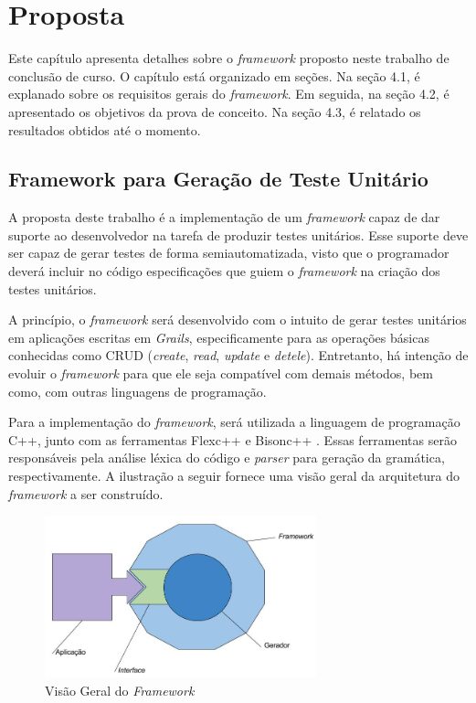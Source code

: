 \chapter[Proposta]{Proposta}
Este capítulo apresenta detalhes sobre o \textit{framework} proposto neste trabalho de conclusão de curso. O capítulo está organizado em seções. Na seção 4.1, é explanado sobre os requisitos gerais do \textit{framework}. Em seguida, na seção 4.2, é apresentado os objetivos da prova de conceito. Na seção 4.3, é relatado os resultados obtidos até o momento.

\section{Framework para Geração de Teste Unitário}

A proposta deste trabalho é a implementação de um \textit{framework} capaz de dar suporte ao desenvolvedor na tarefa de produzir testes unitários.  Esse suporte deve ser capaz de gerar testes de forma semiautomatizada, visto que o programador deverá incluir no código especificações que guiem o \textit{framework} na criação dos testes unitários. 
\par
\indent A princípio, o \textit{framework} será desenvolvido com o intuito de gerar testes unitários em aplicações escritas em \textit{Grails}, especificamente para as operações básicas conhecidas como CRUD (\textit{create}, \textit{read}, \textit{update} e \textit{detele}). Entretanto, há intenção de evoluir o \textit{framework} para que ele seja compatível com demais métodos, bem como, com outras linguagens de programação. 
\par
\indent Para a implementação do \textit{framework}, será utilizada a linguagem de programação C++, junto com as ferramentas Flexc++ \cite{flexcpp2015} e Bisonc++ \cite{bisoncpp2015}. Essas ferramentas serão responsáveis pela análise léxica do código e \textit{parser} para geração da gramática, respectivamente. A ilustração a seguir fornece uma visão geral da arquitetura do \textit{framework} a  ser construído.
 
 \begin{figure}[h]
    \centering
    \includegraphics[width=0.7\textwidth]{figuras/estruturaarquitetural.jpg}
    \caption{Visão Geral do \textit{Framework}}
    \label{fig:estruturaarquitetural}
 \end{figure}

